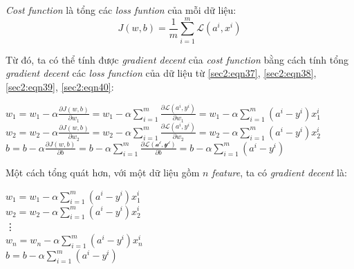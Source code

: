 \textit{Cost function} là tổng các \textit{loss funtion} của mỗi dữ liệu:
\begin{equation}
\label{sec2:eqn40}
J(w,b) = \frac{1}{m}\sum_{i=1}^{m}\mathcal{L}(a^{i}, x^{i})
\end{equation}

Từ đó, ta có thể tính được \textit{gradient decent} của \textit{cost function} bằng cách tính tổng \textit{gradient decent} các \textit{loss function} của dữ liệu từ \ref{sec2:eqn37}, \ref{sec2:eqn38}, \ref{sec2:eqn39}, \ref{sec2:eqn40}:
\begin{center}
$w_{1} = w_{1} - \alpha\frac{\partial J(w,b)}{\partial w_{1}} = w_{1} - \alpha\sum_{i=1}^m\frac{\partial \mathcal{L} (a^{i}, y^{i})}{\partial w_{1}} = w_{1} - \alpha\sum_{i=1}^m(a^{i} - y^{i})x_{1}^{i}$\\
$w_{2} = w_{2} - \alpha\frac{\partial J(w,b)}{\partial w_{2}} = w_{2} - \alpha\sum_{i=1}^m\frac{\partial \mathcal{L}(a^{i}, y^{i})}{\partial w_{2}} = w_{2} - \alpha\sum_{i=1}^m(a^{i} - y^{i})x_{2}^{i}$\\
$b = b - \alpha\frac{\partial J(w,b)}{\partial b} = b - \alpha\sum_{i=1}^m\frac{\partial \mathcal{L(a^{i}, y^{i})}}{\partial b} = b - \alpha\sum_{i=1}^m(a^{i} - y^{i})$
\end{center}

Một cách tổng quát hơn, với một dữ liệu gồm $n$ \textit{feature}, ta có \textit{gradient decent} là:
\begin{center}
$w_{1} =  w_{1} - \alpha\sum_{i=1}^m(a^{i} - y^{i})x_{1}^{i}$\\
$w_{2} =  w_{2} - \alpha\sum_{i=1}^m(a^{i} - y^{i})x_{2}^{i}$\\
\quad     \vdots\\
$w_{n} = w_{n} - \alpha\sum_{i=1}^m(a^{i} - y^{i})x_{n}^{i}$\\
$b =  b - \alpha\sum_{i=1}^m(a^{i} - y^{i})$
\end{center}


